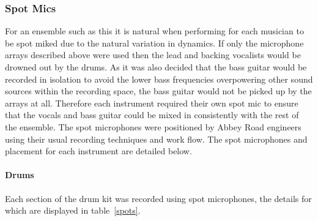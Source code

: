 		\subsubsection{Spot Mics}

			For an ensemble such as this it is natural when performing for each musician to be spot miked due to the natural variation in dynamics. If only the microphone arrays described above were used then the lead and backing vocalists would be drowned out by the drums. As it was also decided that the bass guitar would be recorded in isolation to avoid the lower bass frequencies overpowering other sound sources within the recording space, the bass guitar would not be picked up by the arrays at all. Therefore each instrument required their own spot mic to ensure that the vocals and bass guitar could be mixed in consistently with the rest of the ensemble. The spot microphones were positioned by Abbey Road engineers using their usual recording techniques and work flow. The spot microphones and placement for each instrument are detailed below.\\
			
			\paragraph{Drums}

			Each section of the drum kit was recorded using spot microphones, the details for which are displayed in table~\ref{spots}.\\

